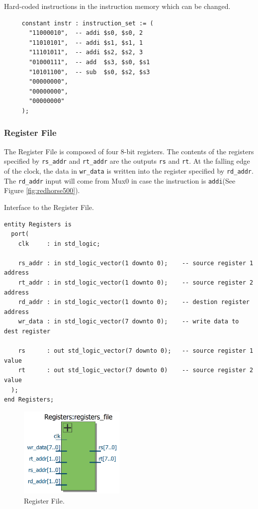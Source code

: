 \documentclass[a4paper, 11pt,oneside]{article}
\begin{document}
\begin{listing}[H]
\caption{Hard-coded instructions in the instruction memory which can be 
changed.}
\label{code:im_code}
\begin{verbatim}
     constant instr : instruction_set := (
       "11000010",  -- addi $s0, $s0, 2
       "11010101",  -- addi $s1, $s1, 1
       "11101011",  -- addi $s2, $s2, 3
       "01000111",  -- add  $s3, $s0, $s1
       "10101100",  -- sub  $s0, $s2, $s3
       "00000000",
       "00000000",
       "00000000"
     );    
\end{verbatim}
\end{listing}


\subsubsection{Register File}
The Register File is composed of four 8-bit registers. The contents of the 
registers specified by \texttt{rs_addr} and 
\texttt{rt_addr} are the outputs \texttt{rs} and 
\texttt{rt}. At the falling edge of the clock, the data in 
\texttt{wr_data} is written into the register 
specified by \texttt{rd_addr}. The \texttt{rd_addr} input 
will come from Mux0 in case the instruction is \texttt{addi}(See 
Figure \ref{fig:redhorse500}).


\begin{listing}[H]
\caption{Interface to the Register File.}
\label{code:rf}
\begin{verbatim}
entity Registers is
  port(
    clk     : in std_logic;

    rs_addr : in std_logic_vector(1 downto 0);    -- source register 1 address
    rt_addr : in std_logic_vector(1 downto 0);    -- source register 2 address
    rd_addr : in std_logic_vector(1 downto 0);    -- destion register address
    wr_data : in std_logic_vector(7 downto 0);    -- write data to dest register

    rs      : out std_logic_vector(7 downto 0);   -- source register 1 value
    rt      : out std_logic_vector(7 downto 0)    -- source register 2 value
  );
end Registers;

\end{verbatim}
\end{listing}

\begin{figure}[H]
	\begin{center}
	\includegraphics[width=2in]{rf.png}
	\caption{Register File.}
	\label{fig:rf} 
	\end{center}
\end{figure}
\end{document}
